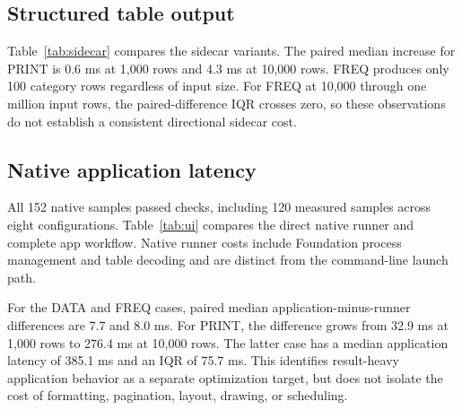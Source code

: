 \documentclass[11pt,a4paper]{article}
\begin{document}
\subsection{Structured table output}

Table~\ref{tab:sidecar} compares the sidecar variants. The paired
median increase for PRINT is 0.6 ms at 1,000 rows and 4.3 ms at
10,000 rows. FREQ produces only 100 category rows regardless of
input size. For FREQ at 10,000 through one million input rows,
the paired-difference IQR crosses zero, so these observations
do not establish a consistent directional sidecar cost.

\begin{table}[tbp]
\centering
\small

\caption{CLI table-output comparison in milliseconds. Values
are medians (IQR widths). The paired difference is sidecar minus
plain execution, matched by iteration. It can differ in sign
from the difference of marginal medians.}
\label{tab:sidecar}
\end{table}

\subsection{Native application latency}

All 152 native samples passed checks, including 120 measured
samples across eight configurations. Table~\ref{tab:ui} compares
the direct native runner and complete app workflow. Native runner
costs include Foundation process management and table decoding
and are distinct from the command-line launch path.

\begin{table}[tbp]
\centering
\small

\caption{Native runner and application latency in milliseconds:
medians (IQR widths), fifteen measured repetitions per cell.
The paired difference is application minus runner. App timing
ends after the first synchronous display pass, not physical
screen presentation.}
\label{tab:ui}
\end{table}

For the DATA and FREQ cases, paired median application-minus-runner
differences are 7.7 and 8.0 ms. For PRINT, the difference grows
from 32.9 ms at 1,000 rows to 276.4 ms at 10,000 rows. The latter
case has a median application latency of 385.1 ms and an IQR of
75.7 ms. This identifies result-heavy application behavior as a
separate optimization target, but does not isolate the cost of
formatting, pagination, layout, drawing, or scheduling.
\end{document}

